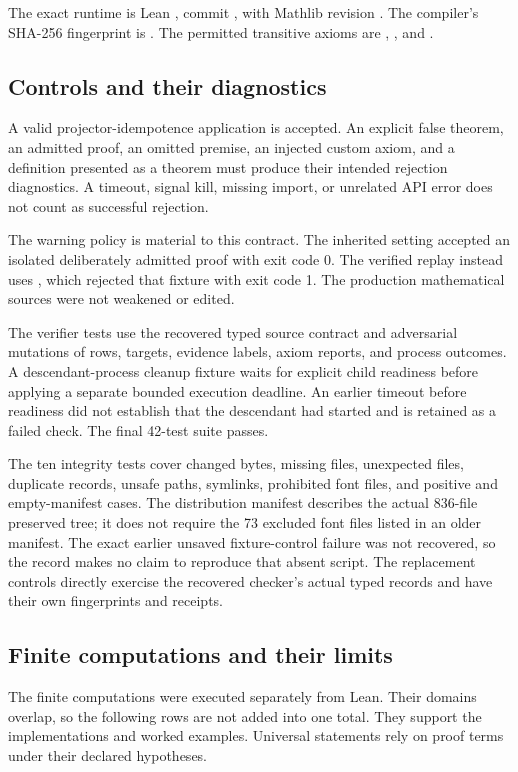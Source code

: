 The exact runtime is Lean , commit , with Mathlib revision . The compiler's SHA-256 fingerprint is . The permitted transitive axioms are , , and .

\subsection{Controls and their diagnostics}
A valid projector-idempotence application is accepted. An explicit false theorem, an admitted proof, an omitted premise, an injected custom axiom, and a definition presented as a theorem must produce their intended rejection diagnostics. A timeout, signal kill, missing import, or unrelated API error does not count as successful rejection.

The warning policy is material to this contract. The inherited  setting accepted an isolated deliberately admitted proof with exit code 0. The verified replay instead uses , which rejected that fixture with exit code 1. The production mathematical sources were not weakened or edited.

The verifier tests use the recovered typed source contract and adversarial mutations of rows, targets, evidence labels, axiom reports, and process outcomes. A descendant-process cleanup fixture waits for explicit child readiness before applying a separate bounded execution deadline. An earlier timeout before readiness did not establish that the descendant had started and is retained as a failed check. The final 42-test suite passes.

The ten integrity tests cover changed bytes, missing files, unexpected files, duplicate records, unsafe paths, symlinks, prohibited font files, and positive and empty-manifest cases. The distribution manifest describes the actual 836-file preserved tree; it does not require the 73 excluded font files listed in an older manifest. The exact earlier unsaved fixture-control failure was not recovered, so the record makes no claim to reproduce that absent script. The replacement controls directly exercise the recovered checker's actual typed records and have their own fingerprints and receipts.

\subsection{Finite computations and their limits}
The finite computations were executed separately from Lean. Their domains overlap, so the following rows are not added into one total. They support the implementations and worked examples. Universal statements rely on proof terms under their declared hypotheses.

